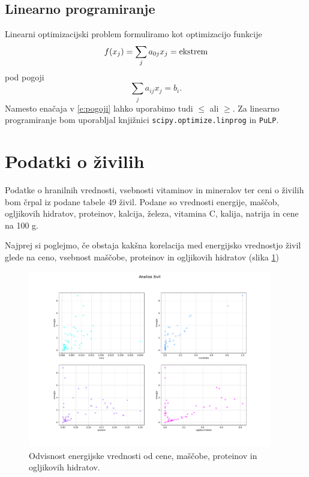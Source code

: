 \documentclass[a4paper, 12pt, slovene]{article}
\numberwithin{equation}{section}
\begin{document}
\subsection{Linearno programiranje}
Linearni optimizacijski problem formuliramo kot optimizacijo funkcije
\begin{equation}
f(x_j) = \sum_j a_{0j}x_j = \rm{ekstrem}
\end{equation}
pod pogoji
\begin{equation}
\sum_j a_{ij}x_j = b_i.
\label{e:pogoji}
\end{equation}
Namesto enačaja v \eqref{e:pogoji} lahko uporabimo tudi $\leq$ ali $\geq$. Za linearno programiranje bom uporabljal knjižnici \texttt{scipy.optimize.linprog} in \texttt{PuLP}.


\section{Podatki o živilih}
Podatke o hranilnih vrednosti, vsebnosti vitaminov in mineralov ter ceni o živilih bom črpal iz podane tabele 49 živil. Podane so vrednosti energije, maščob, ogljikovih hidratov, proteinov, kalcija, železa, vitamina C, kalija, natrija in cene na 100 g. \par\vspace{5mm}

Najprej si poglejmo, če obstaja kakšna korelacija med energijsko vrednostjo živil glede na ceno, vsebnost maščobe, proteinov in ogljikovih hidratov (slika \ref{f:analiza})

\begin{figure}[H]
\centering
\includegraphics[width=0.95\textwidth]{grafi/analiza_zivil.pdf}
\caption{Odvisnost energijske vrednosti od cene, maščobe, proteinov in ogljikovih hidratov.}
\label{f:analiza}
\end{figure}
\end{document}
